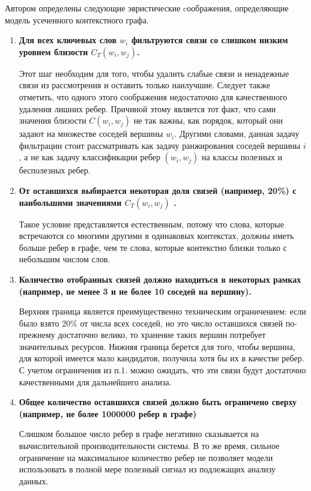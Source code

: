 Автором определены следующие эвристические cоображения, определяющие модель усеченного контекстного графа.
\begin{enumerate}
    \item \textbf{Для всех ключевых слов $w_i$ фильтруются связи со слишком низким уровнем близости $C_{T}(w_i,w_j)$.}

    Этот шаг необходим для того, чтобы удалить слабые связи и ненадежные связи из рассмотрения и оставить только наилучшие. Следует также отметить, что одного этого соображения недостаточно для качественного удаления лишних ребер. Причиной этому является тот факт, что сами значения близости $C(w_i,w_j)$ не так важны, как порядок, который они задают на множестве соседей вершины $w_i$.  Другими словами, данная задачу фильтрации стоит рассматривать как задачу ранжирования соседей вершины $i$ , а не как задачу классификации ребер $(w_i, w_j)$ на классы полезных и бесполезных ребер.
    \item \textbf{От оставшихся выбирается некоторая доля связей (например, 20\%) с наибольшими значениями $C_{T}(w_i,w_j)$ .}

    Такое условие представляется естественным, потому что слова, которые встречаются со многими другими в одинаковых контекстах, должны иметь больше ребер в графе, чем те слова, которые контекстно близки только с небольшим числом слов.

    \item \textbf{Количество отобранных связей должно находиться в некоторых рамках (например, не менее 3 и не более 10 соседей на вершину).}

    Верхняя граница является преимущественно техническим ограничением: если было взято 20\% от числа всех соседей, но это число оставшихся связей по-прежнему достаточно велико, то хранение таких вершин потребует значительных ресурсов. Нижняя граница берется для того, чтобы вершина, для которой имеется мало кандидатов, получила хотя бы их в качестве ребер. С учетом ограничения из п.1. можно ожидать, что эти связи будут достаточно качественными для дальнейшего анализа.

    \item \textbf{Общее количество оставшихся связей должно быть ограничено сверху (например, не более 1000000 ребер в графе)}

    Слишком большое число ребер в графе негативно сказывается на вычислительной производительности системы. В то же время, сильное ограничение на максимальное количество ребер  не позволяет модели использовать в полной мере полезный сигнал из подлежащих анализу данных.

\end{enumerate}

